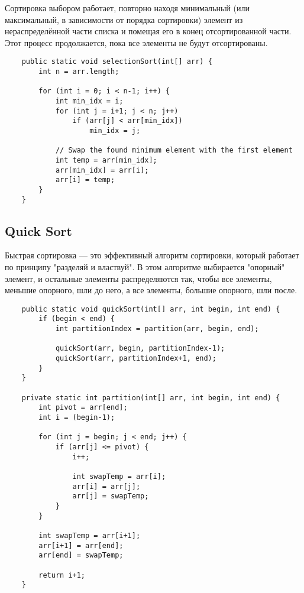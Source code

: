 Сортировка выбором работает, повторно находя минимальный (или максимальный, в зависимости от порядка сортировки) элемент из нераспределённой части списка и помещая его в конец отсортированной части. Этот процесс продолжается, пока все элементы не будут отсортированы.

\begin{lstlisting}
    public static void selectionSort(int[] arr) {
        int n = arr.length;
    
        for (int i = 0; i < n-1; i++) {
            int min_idx = i;
            for (int j = i+1; j < n; j++)
                if (arr[j] < arr[min_idx])
                    min_idx = j;
    
            // Swap the found minimum element with the first element
            int temp = arr[min_idx];
            arr[min_idx] = arr[i];
            arr[i] = temp;
        }
    }
    \end{lstlisting}

\subsection*{Quick Sort}

Быстрая сортировка — это эффективный алгоритм сортировки, который работает по принципу "разделяй и властвуй". В этом алгоритме выбирается "опорный" элемент, и остальные элементы распределяются так, чтобы все элементы, меньшие опорного, шли до него, а все элементы, большие опорного, шли после.

\begin{lstlisting}
    public static void quickSort(int[] arr, int begin, int end) {
        if (begin < end) {
            int partitionIndex = partition(arr, begin, end);
    
            quickSort(arr, begin, partitionIndex-1);
            quickSort(arr, partitionIndex+1, end);
        }
    }
    
    private static int partition(int[] arr, int begin, int end) {
        int pivot = arr[end];
        int i = (begin-1);
    
        for (int j = begin; j < end; j++) {
            if (arr[j] <= pivot) {
                i++;
    
                int swapTemp = arr[i];
                arr[i] = arr[j];
                arr[j] = swapTemp;
            }
        }
    
        int swapTemp = arr[i+1];
        arr[i+1] = arr[end];
        arr[end] = swapTemp;
    
        return i+1;
    }
    \end{lstlisting}

